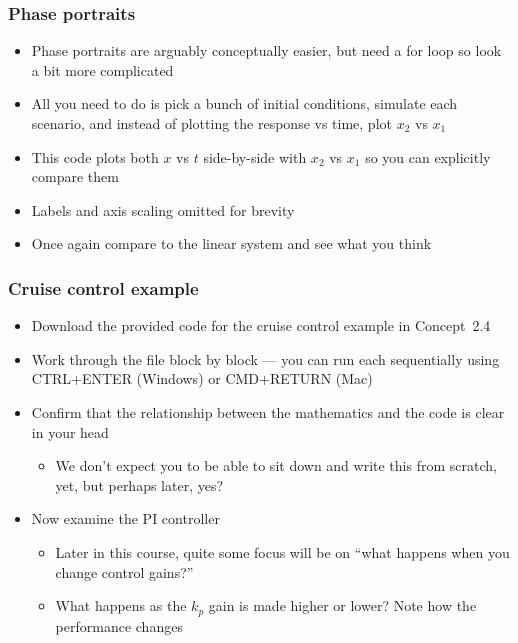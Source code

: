 \documentclass[9pt]{beamer-control}
\begin{document}
\begin{frame}
\frametitle{Phase portraits}
\begin{itemize}
\item
Phase portraits are arguably conceptually easier, but need a for loop so look a bit more complicated
\item
All you need to do is pick a bunch of initial conditions, simulate each scenario, and instead of plotting the response vs time, plot $x_2$ vs $x_1$
\item
This code plots both $x$ vs $t$ side-by-side with $x_2$ vs $x_1$  so you can explicitly compare them
\item
Labels and axis scaling omitted for brevity
\item
Once again compare to the linear system and see what you think
\end{itemize}


\end{frame}

\begin{frame}
\frametitle{Cruise control example}
\begin{itemize}
\item Download the provided code for the cruise control example in Concept~2.4
\item Work through the file block by block --- you can run each sequentially using CTRL+ENTER (Windows) or CMD+RETURN (Mac)
\item Confirm that the relationship between the mathematics and the code is clear in your head
\begin{itemize}
\item We don't expect you to be able to sit down and write this from scratch, yet, but perhaps later, yes?
\end{itemize}
\item Now examine the PI controller
\begin{itemize}
\item
Later in this course, quite some focus will be on ``what happens when you change control gains?''
\item
What happens as the $k_p$ gain is made higher or lower? Note how the performance changes
\end{itemize}
\end{itemize}
\end{frame}
\end{document}
